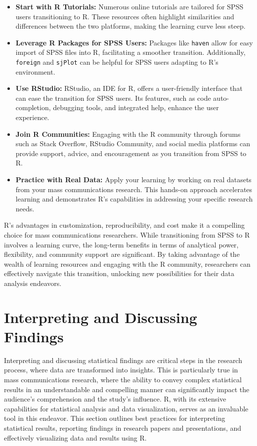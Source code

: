 \documentclass[
]{book}
\begin{document}
\begin{itemize}
\item
  \textbf{Start with R Tutorials:} Numerous online tutorials are tailored for SPSS users transitioning to R. These resources often highlight similarities and differences between the two platforms, making the learning curve less steep.
\item
  \textbf{Leverage R Packages for SPSS Users:} Packages like \texttt{haven} allow for easy import of SPSS files into R, facilitating a smoother transition. Additionally, \texttt{foreign} and \texttt{sjPlot} can be helpful for SPSS users adapting to R's environment.
\item
  \textbf{Use RStudio:} RStudio, an IDE for R, offers a user-friendly interface that can ease the transition for SPSS users. Its features, such as code auto-completion, debugging tools, and integrated help, enhance the user experience.
\item
  \textbf{Join R Communities:} Engaging with the R community through forums such as Stack Overflow, RStudio Community, and social media platforms can provide support, advice, and encouragement as you transition from SPSS to R.
\item
  \textbf{Practice with Real Data:} Apply your learning by working on real datasets from your mass communications research. This hands-on approach accelerates learning and demonstrates R's capabilities in addressing your specific research needs.
\end{itemize}

R's advantages in customization, reproducibility, and cost make it a compelling choice for mass communications researchers. While transitioning from SPSS to R involves a learning curve, the long-term benefits in terms of analytical power, flexibility, and community support are significant. By taking advantage of the wealth of learning resources and engaging with the R community, researchers can effectively navigate this transition, unlocking new possibilities for their data analysis endeavors.

\hypertarget{interpreting-and-discussing-findings}{%
\section{Interpreting and Discussing Findings}\label{interpreting-and-discussing-findings}}

Interpreting and discussing statistical findings are critical steps in the research process, where data are transformed into insights. This is particularly true in mass communications research, where the ability to convey complex statistical results in an understandable and compelling manner can significantly impact the audience's comprehension and the study's influence. R, with its extensive capabilities for statistical analysis and data visualization, serves as an invaluable tool in this endeavor. This section outlines best practices for interpreting statistical results, reporting findings in research papers and presentations, and effectively visualizing data and results using R.
\end{document}
